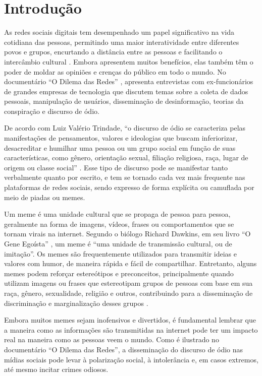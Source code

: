 \chapter{Introdução}
\label{cap:01}

As redes sociais digitais tem desempenhado um papel significativo na vida cotidiana das pessoas, permitindo uma maior interatividade entre diferentes povos e grupos, encurtando a distância entre as pessoas e facilitando o intercâmbio cultural \cite{Nascimento2017}. Embora apresentem muitos benefícios, elas também têm o poder de moldar as opiniões e crenças do público em todo o mundo. No documentário “O Dilema das Redes” \cite{SocialDilemma2020}, apresenta entrevistas com ex-funcionários de grandes empresas de tecnologia que discutem temas sobre a coleta de dados pessoais, manipulação de usuários, disseminação de desinformação, teorias da conspiração e discurso de ódio.

De acordo com Luiz Valério Trindade, ``o discurso de ódio se caracteriza pelas manifestações de pensamentos, valores e ideologias que buscam inferiorizar, desacreditar e humilhar uma pessoa ou um grupo social em função de suas características, como gênero, orientação sexual, filiação religiosa, raça, lugar de origem ou classe social'' \cite{Trindade2022}. Esse tipo de discurso pode se manifestar tanto verbalmente quanto por escrito, e tem se tornado cada vez mais frequente nas plataformas de redes sociais, sendo expresso de forma explícita ou camuflada por meio de piadas ou memes.

Um meme é uma unidade cultural que se propaga de pessoa para pessoa, geralmente na forma de imagens, vídeos, frases ou comportamentos que se tornam virais na internet. Segundo o biólogo Richard Dawkins, em seu livro “O Gene Egoísta” \cite{Dawkins1976}, um meme é ``uma unidade de transmissão cultural, ou de imitação''. Os memes são frequentemente utilizados para transmitir ideias e valores com humor, de maneira rápida e fácil de compartilhar. Entretanto, alguns memes podem reforçar estereótipos e preconceitos, principalmente quando utilizam imagens ou frases que estereotipam grupos de pessoas com base em sua raça, gênero, sexualidade, religião e outros, contribuindo para a disseminação de discriminação e marginalização desses grupos \cite{Burke2004}.

Embora muitos memes sejam inofensivos e divertidos, é fundamental lembrar que a maneira como as informações são transmitidas na internet pode ter um impacto real na maneira como as pessoas veem o mundo. Como é ilustrado no documentário “O Dilema das Redes”, a disseminação do discurso de ódio nas mídias sociais pode levar à polarização social, à intolerância e, em casos extremos, até mesmo incitar crimes odiosos. 


